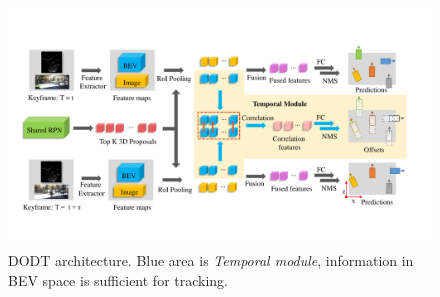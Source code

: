 \documentclass[a4paper, 10pt, conference]{ieeeconf}      %
\begin{document}


\begin{figure}
	\vspace{-0.6cm}
	\rule{0pt}{1ex}
	\begin{center}
		\includegraphics[trim={1.1cm, 2.8cm, 1.5cm, 3cm}, clip, width=\textwidth]{images/structure02.pdf}
	\end{center}
	\caption{DODT architecture. Blue area is \textit{Temporal module}, information in BEV space is sufficient for tracking.}
	\label{fig:dodt}
	\vspace{-0.5cm}
\end{figure}
\end{document}

